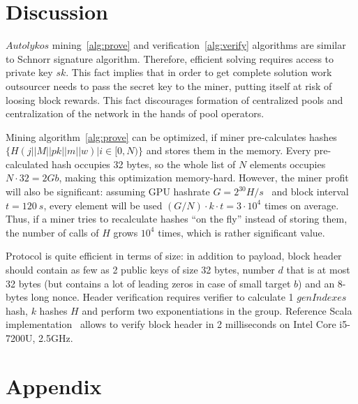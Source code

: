 \documentclass[]{article}
\newcommand{\vk}[1]{\textcolor{blue}{V: {#1}}}
\newcommand{\Name}{$Autolykos$}
\begin{document}

    \section{Discussion}
    \label{discussion}

    \Name{} mining~\ref{alg:prove} and verification~\ref{alg:verify} algorithms
    are similar to Schnorr signature algorithm. Therefore, efficient solving
    requires access to private key $sk$. This fact implies that in order to get
    complete solution work outsourcer needs to pass the secret key to the miner,
    putting itself at risk of loosing block rewards.
    This fact discourages formation of centralized pools and centralization of the network in the hands of pool operators.

    Mining algorithm~\ref{alg:prove} can be optimized, if miner pre-calculates
    hashes\newline $\{H(j||M||pk||m||w)|i \in [0,N)\}$ and stores them in the memory.
    Every pre-calculated hash occupies 32 bytes, so the whole list of $N$ elements
    occupies $N \cdot 32 = 2 Gb$, making this optimization memory-hard.
    However, the miner profit will also be significant: assuming GPU hashrate
    $G = 2^{30} H/s$~\cite{gpuHashrate} and block interval $t=120~s$, every element
    will be used $(G / N) \cdot k \cdot t = 3 \cdot 10^4$ times on average.
    Thus, if a miner tries to 
    recalculate hashes ``on the fly'' instead of storing them, the number of
    calls of $H$ grows $10^4$ times, which is rather significant value.

    Protocol is quite efficient in terms of size: in addition to payload, block header should
    contain as few as 2 public keys of size 32 bytes, number $d$ that is at most 32 bytes
    (but contains a lot of leading zeros in case of small target $b$) and an
    8-bytes long nonce. Header verification requires verifier to calculate 1 $genIndexes$
    hash, $k$ hashes $H$ and perform two exponentiations in the group. Reference
    Scala implementation~\cite{ergoGit} allows to verify block header in 2
    milliseconds on Intel Core i5-7200U, 2.5GHz.

    

    \section*{Appendix}
    \label{appendix}
\end{document}
